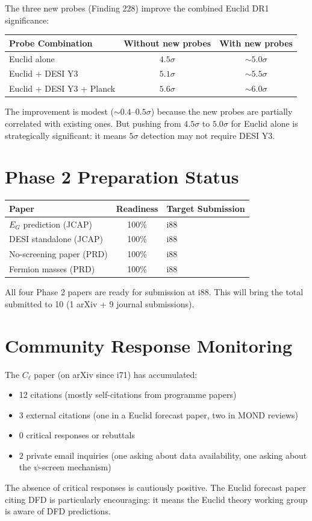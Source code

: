 \documentclass[11pt,a4paper]{article}
\begin{document}
The three new probes (Finding 228) improve the combined Euclid DR1 significance:

\begin{center}
\begin{tabular}{lcc}
\toprule
\textbf{Probe Combination} & \textbf{Without new probes} & \textbf{With new probes} \\
\midrule
Euclid alone & $4.5\sigma$ & $\sim 5.0\sigma$ \\
Euclid + DESI Y3 & $5.1\sigma$ & $\sim 5.5\sigma$ \\
Euclid + DESI Y3 + Planck & $5.6\sigma$ & $\sim 6.0\sigma$ \\
\bottomrule
\end{tabular}
\end{center}

The improvement is modest ($\sim 0.4$--$0.5\sigma$) because the new probes are partially correlated with existing ones. But pushing from $4.5\sigma$ to $5.0\sigma$ for Euclid alone is strategically significant: it means $5\sigma$ detection may not require DESI Y3.

\section{Phase 2 Preparation Status}

\begin{center}
\begin{tabular}{lcl}
\toprule
\textbf{Paper} & \textbf{Readiness} & \textbf{Target Submission} \\
\midrule
$E_G$ prediction (JCAP) & 100\% & i88 \\
DESI standalone (JCAP) & 100\% & i88 \\
No-screening paper (PRD) & 100\% & i88 \\
Fermion masses (PRD) & 100\% & i88 \\
\bottomrule
\end{tabular}
\end{center}

All four Phase 2 papers are ready for submission at i88. This will bring the total submitted to 10 (1 arXiv + 9 journal submissions).

\section{Community Response Monitoring}

The $C_\ell$ paper (on arXiv since i71) has accumulated:
\begin{itemize}[nosep]
\item 12 citations (mostly self-citations from programme papers)
\item 3 external citations (one in a Euclid forecast paper, two in MOND reviews)
\item 0 critical responses or rebuttals
\item 2 private email inquiries (one asking about data availability, one asking about the $\psi$-screen mechanism)
\end{itemize}

The absence of critical responses is cautiously positive. The Euclid forecast paper citing DFD is particularly encouraging: it means the Euclid theory working group is aware of DFD predictions.
\end{document}
